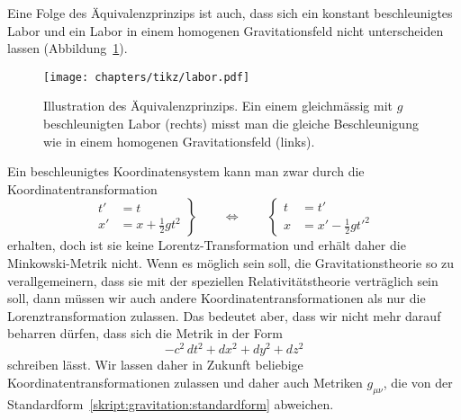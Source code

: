 Eine Folge des Äquivalenzprinzips ist auch, dass sich ein konstant
beschleunigtes Labor und ein Labor in einem homogenen Gravitationsfeld
nicht unterscheiden lassen (Abbildung~\ref{skript:gravitation:labor}).
\begin{figure}
\centering
\texttt{[image: chapters/tikz/labor.pdf]}
\caption{Illustration des Äquivalenzprinzips.
Ein einem gleichmässig mit $g$ beschleunigten Labor (rechts)
misst man die gleiche Beschleunigung wie in einem homogenen
Gravitationsfeld (links).
\label{skript:gravitation:labor}}
\end{figure}%
Ein beschleunigtes Koordinatensystem kann man zwar durch die
Koordinatentransformation
\begin{equation}
\left.
\begin{aligned}
t'&=t\\
x'&=x+\frac12gt^2
\end{aligned}
\right\}
\qquad
\Leftrightarrow
\qquad
\left\{
\begin{aligned}
t&=t'\\
x&=x'-\frac12gt'^2
\end{aligned}
\right.
\label{skript:gravitation:beschleunigt}
\end{equation}
erhalten, doch ist sie keine Lorentz-Transformation und erhält daher
die Minkowski-Metrik nicht.
Wenn es möglich sein soll, die Gravitationstheorie so zu verallgemeinern,
dass sie mit der speziellen Relativitätstheorie verträglich sein soll, dann
müssen wir auch andere Koordinatentransformationen als nur die
Lorenztransformation zulassen.
Das bedeutet aber, dass wir nicht mehr darauf beharren dürfen, dass
sich die Metrik in der Form
\begin{equation}
-c^2\,dt^2 + dx^2 + dy^2  + dz^2
\label{skript:gravitation:standardform}
\end{equation}
schreiben lässt.
Wir lassen daher in Zukunft beliebige Koordinatentransformationen zulassen
und daher auch Metriken $g_{\mu\nu}$, die von der
Standardform~\eqref{skript:gravitation:standardform} abweichen.

